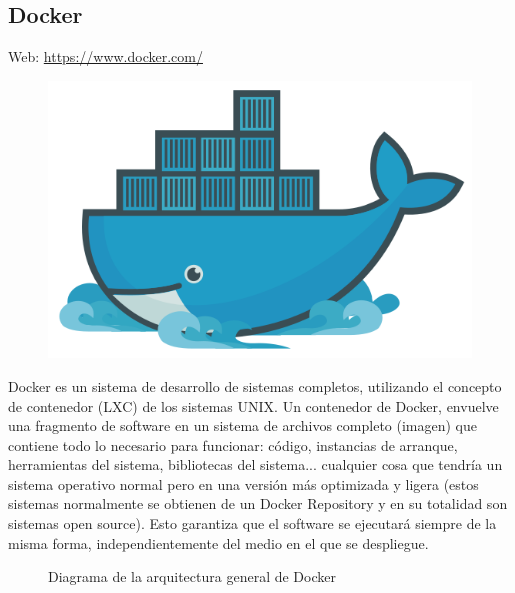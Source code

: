 \subsection{Docker}
Web: \url{https://www.docker.com/}\\
\begin{figure}[H]
  \begin{center}
    \includegraphics[scale=0.5]{diagramas/docker-logo.png}
  \end{center}
\end{figure}

Docker es un sistema de desarrollo de sistemas completos, utilizando el concepto de contenedor (LXC) de los sistemas UNIX. Un contenedor de Docker, envuelve una fragmento de software en un sistema de archivos completo (imagen) que contiene todo lo necesario para funcionar: código, instancias de arranque, herramientas del sistema, bibliotecas del sistema... cualquier cosa que tendría un sistema operativo normal pero en una versión más optimizada y ligera (estos sistemas normalmente se obtienen de un Docker Repository y en su totalidad son sistemas open source). Esto garantiza que el software se ejecutará siempre de la misma forma, independientemente del medio en el que se despliegue.\\

\begin{figure}[H]
  \caption{Diagrama de la arquitectura general de Docker}
\end{figure}
\newpage

